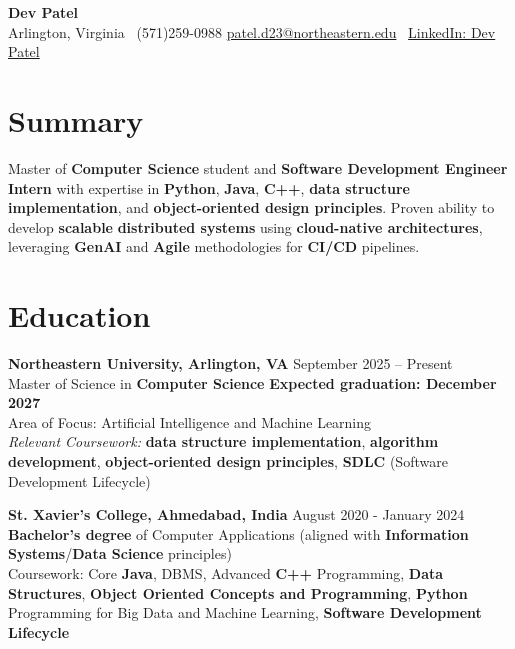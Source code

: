 \documentclass[a4paper,10pt]{article}
\begin{document}
\begin{center}
\vspace{-3mm}
    \fontsize{16}{18}\selectfont \textbf{Dev Patel} \\
    \vspace{0mm}
    \normalsize Arlington, Virginia \textbar\ (571)259-0988  \textbar       \href{mailto:patel.d23@northeastern.edu}{patel.d23@northeastern.edu} \textbar\ \href{https://www.linkedin.com/in/devxpatel//}{LinkedIn: Dev Patel} \\
\end{center}


\section*{Summary}
Master of \textbf{Computer Science} student and \textbf{Software Development Engineer Intern} with expertise in \textbf{Python}, \textbf{Java}, \textbf{C++}, \textbf{data structure implementation}, and \textbf{object-oriented design principles}. Proven ability to develop \textbf{scalable} \textbf{distributed systems} using \textbf{cloud-native architectures}, leveraging \textbf{GenAI} and \textbf{Agile} methodologies for \textbf{CI/CD} pipelines.
 
\vspace{ 0 mm}
\section*{Education}
\textbf{Northeastern University, Arlington, VA} \hfill September 2025 -- Present\\
Master of Science in \textbf{Computer Science} \hfill \textbf{Expected graduation: December 2027} \\
Area of Focus: Artificial Intelligence and Machine Learning\\
\textit{Relevant Coursework:} \textbf{data structure implementation}, \textbf{algorithm development}, \textbf{object-oriented design principles}, \textbf{SDLC} (Software Development Lifecycle)

\vspace{1 mm} %
\textbf{St. Xavier's College, Ahmedabad, India} \hfill August 2020 - January 2024 \\
\textbf{Bachelor's degree} of Computer Applications (aligned with \textbf{Information Systems}/\textbf{Data Science} principles)\\
Coursework: Core \textbf{Java}, DBMS, Advanced \textbf{C++} Programming, \textbf{Data Structures}, \textbf{Object Oriented Concepts and Programming}, \textbf{Python} Programming for Big Data and Machine Learning, \textbf{Software Development Lifecycle}
\end{document}
